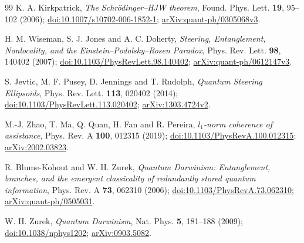 \documentclass[11pt,a4paper]{article}
\theoremstyle{definition}
\theoremstyle{plain}
\begin{document}
\clearpage
\begingroup\small
\begin{thebibliography}{99}
\setlength{\itemsep}{2pt}
K. A. Kirkpatrick, \emph{The Schr\"odinger--HJW theorem},
Found. Phys. Lett. \textbf{19}, 95--102 (2006);
\href{https://doi.org/10.1007/s10702-006-1852-1}{doi:10.1007/s10702-006-1852-1};
\href{https://arxiv.org/abs/quant-ph/0305068v3}{arXiv:quant-ph/0305068v3}.

H. M. Wiseman, S. J. Jones and A. C. Doherty,
\emph{Steering, Entanglement, Nonlocality, and the Einstein--Podolsky--Rosen Paradox},
Phys. Rev. Lett. \textbf{98}, 140402 (2007);
\href{https://doi.org/10.1103/PhysRevLett.98.140402}{doi:10.1103/PhysRevLett.98.140402};
\href{https://arxiv.org/abs/quant-ph/0612147v3}{arXiv:quant-ph/0612147v3}.

S. Jevtic, M. F. Pusey, D. Jennings and T. Rudolph,
\emph{Quantum Steering Ellipsoids}, Phys. Rev. Lett. \textbf{113}, 020402 (2014);
\href{https://doi.org/10.1103/PhysRevLett.113.020402}{doi:10.1103/PhysRevLett.113.020402};
\href{https://arxiv.org/abs/1303.4724v2}{arXiv:1303.4724v2}.

M.-J. Zhao, T. Ma, Q. Quan, H. Fan and R. Pereira,
\emph{$l_1$-norm coherence of assistance},
Phys. Rev. A \textbf{100}, 012315 (2019);
\href{https://doi.org/10.1103/PhysRevA.100.012315}{doi:10.1103/PhysRevA.100.012315};
\href{https://arxiv.org/abs/2002.03823}{arXiv:2002.03823}.

R. Blume-Kohout and W. H. Zurek,
\emph{Quantum Darwinism: Entanglement, branches, and the emergent classicality
of redundantly stored quantum information},
Phys. Rev. A \textbf{73}, 062310 (2006);
\href{https://doi.org/10.1103/PhysRevA.73.062310}{doi:10.1103/PhysRevA.73.062310};
\href{https://arxiv.org/abs/quant-ph/0505031}{arXiv:quant-ph/0505031}.

W. H. Zurek, \emph{Quantum Darwinism}, Nat. Phys. \textbf{5}, 181--188 (2009);
\href{https://doi.org/10.1038/nphys1202}{doi:10.1038/nphys1202};
\href{https://arxiv.org/abs/0903.5082}{arXiv:0903.5082}.
\end{thebibliography}
\endgroup
\end{document}

